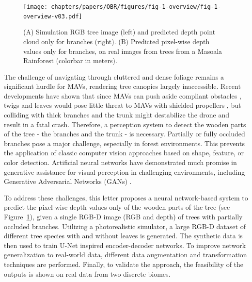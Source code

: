 \begin{figure}[!t]
\centering
\texttt{[image: chapters/papers/OBR/figures/fig-1-overview/fig-1-overview-v03.pdf]}
\vspace{\figurevspaceabove}
\caption{(A) Simulation RGB tree image (left) and predicted depth point cloud only for branches (right). (B) Predicted pixel-wise depth values only for branches, on real images from trees from a Masoala Rainforest (colorbar in meters).
}
\label{fig-1-overview}
\vspace{-0.6cm}
\end{figure}
The challenge of navigating through cluttered and dense foliage remains a significant hurdle for MAVs, rendering tree canopies largely inaccessible. Recent developments have shown that since MAVs can push aside compliant obstacles \cite{Aucone2023}, twigs and leaves would pose little threat to MAVs with shielded propellers \cite{Mulgaonkar2018b},
but colliding with thick branches and the trunk might destabilize the drone and result in a fatal crash. Therefore, a perception system to detect the wooden parts of the tree - the branches and the trunk - is necessary. Partially or fully occluded branches pose a major challenge, especially in forest environments. This prevents the application of classic computer vision approaches based on shape, feature, or color detection. 
Artificial neural networks have demonstrated much promise in generative assistance for visual perception in challenging environments, including  Generative Adversarial Networks (GANs) \cite{Islam2020}.

To address these challenges, this letter proposes a neural network-based system to predict the pixel-wise depth values only of the wooden parts of the tree (see Figure~\ref{fig-1-overview}), given a single RGB-D image (RGB and depth) of trees with partially occluded branches.
Utilizing a photorealistic simulator, a large RGB-D dataset of different tree species with and without leaves is generated. The synthetic data is then used to train U-Net inspired encoder-decoder networks. To improve network
generalization to real-world data, different data augmentation and transformation techniques are performed. Finally, to validate the approach, the feasibility of the outputs is shown on real data from two discrete biomes. 

